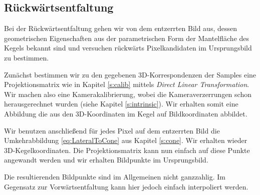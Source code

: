 \subsection{Rückwärtsentfaltung}
Bei der Rückwärtsentfaltung gehen wir von dem entzerrten Bild aus, dessen geometrischen Eigenschaften aus der parametrischen Form der Mantelfläche des Kegels bekannt sind und versuchen rückwärts Pixelkandidaten im Ursprungsbild zu bestimmen. 

Zunächst bestimmen wir zu den gegebenen 3D-Korrespondenzen der Samples eine Projektionsmatrix wie in Kapitel \ref{s:calib} mittels \textit{Direct Linear Transformation}. Wir machen also eine Kamerakalibrierung, wobei die Kameraverzerrungen schon herausgerechnet wurden (siehe Kapitel \ref{s:intrinsic}). Wir erhalten somit eine Abbildung die aus den 3D-Koordinaten im Kegel auf Bildkoordinaten abbildet. 

Wir benutzen anschließend für jedes Pixel auf dem entzerrten Bild die Umkehrabbildung \ref{eq:LateralToCone} aus Kapitel \ref{s:cone}. Wir erhalten wieder 3D-Kegelkoordinaten. Die Projektionsmatrix kann nun einfach auf diese Punkte angewandt werden und wir erhalten Bildpunkte im Ursprungsbild. 

Die resultierenden Bildpunkte sind im Allgemeinen nicht ganzzahlig. Im Gegensatz zur Vorwärtsentfaltung kann hier jedoch einfach interpoliert werden. 


